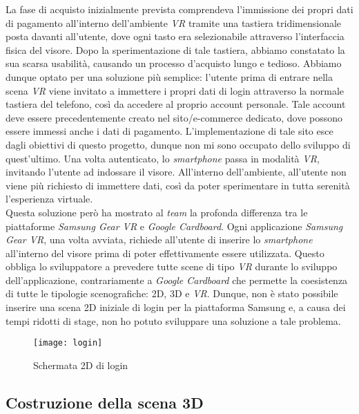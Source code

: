 La fase di acquisto inizialmente prevista comprendeva l'immissione dei propri dati di pagamento all'interno dell'ambiente \textit{VR} tramite una tastiera tridimensionale posta davanti all'utente, dove ogni tasto era selezionabile attraverso l'interfaccia fisica del visore. Dopo la sperimentazione di tale tastiera, abbiamo constatato la sua scarsa usabilità, causando un processo d'acquisto lungo e tedioso. Abbiamo dunque optato per una soluzione più semplice: l'utente prima di entrare nella scena \textit{VR} viene invitato a immettere i propri dati di login attraverso la normale tastiera del telefono, così da accedere al proprio account personale. Tale account deve essere precedentemente creato nel sito/e-commerce dedicato, dove possono essere immessi anche i dati di pagamento. L'implementazione di tale sito esce dagli obiettivi di questo progetto, dunque non mi sono occupato dello sviluppo di quest'ultimo. Una volta autenticato, lo \textit{smartphone} passa in modalità \textit{VR}, invitando l'utente ad indossare il visore. All'interno dell'ambiente, all'utente non viene più richiesto di immettere dati, così da poter sperimentare in tutta serenità l'esperienza virtuale. \\
Questa soluzione però ha mostrato al \textit{team} la profonda differenza tra le piattaforme \textit{Samsung Gear VR} e \textit{Google Cardboard}. Ogni applicazione \textit{Samsung Gear VR}, una volta avviata, richiede all'utente di inserire lo \textit{smartphone} all'interno del visore prima di poter effettivamente essere utilizzata. Questo obbliga lo sviluppatore a prevedere tutte scene di tipo \textit{VR} durante lo sviluppo dell'applicazione, contrariamente a \textit{Google Cardboard} che permette la coesistenza di tutte le tipologie scenografiche: 2D, 3D e \textit{VR}. Dunque, non è stato possibile inserire una scena 2D iniziale di login per la piattaforma Samsung e, a causa dei tempi ridotti di stage, non ho potuto sviluppare una soluzione a tale problema.

\label{Login}
\begin{figure}[ht]
	\begin{center}
		\texttt{[image: login]}
		\caption{Schermata 2D di login}
	\end{center}
\end{figure}
\FloatBarrier

\hypertarget{3.2.3}{\subsection{Costruzione della scena 3D}}

